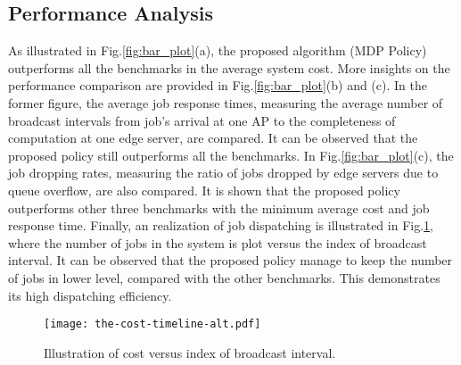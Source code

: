 \subsection{Performance Analysis}
\label{subsec:basic}
As illustrated in Fig.\ref{fig:bar_plot}(a), the proposed algorithm (MDP Policy) outperforms all the benchmarks in the average system cost.
More insights on the performance comparison are provided in Fig.\ref{fig:bar_plot}(b) and (c).
In the former figure, the average job response times, measuring the average number of broadcast intervals from job's arrival at one AP to the completeness of computation at one edge server, are compared.
It can be observed that the proposed policy still outperforms all the benchmarks.
In Fig.\ref{fig:bar_plot}(c), the job dropping rates, measuring the ratio of jobs dropped by edge servers due to queue overflow, are also compared.
It is shown that the proposed policy outperforms other three benchmarks with the minimum average cost and job response time.
Finally, an realization of job dispatching is illustrated in Fig.\ref{fig:general_timeline}, where the number of jobs in the system is plot versus the index of broadcast interval.
It can be observed that the proposed policy manage to keep the number of jobs in lower level, compared with the other benchmarks.
This demonstrates its high dispatching efficiency.
%

\begin{figure}[ht!]                                                                             %
    \centering                                                                                  %
    \texttt{[image: the-cost-timeline-alt.pdf]}                     %
    \caption{Illustration of cost versus index of broadcast interval.}
    \label{fig:general_timeline}                                                                %
\end{figure}                                                                                    %

